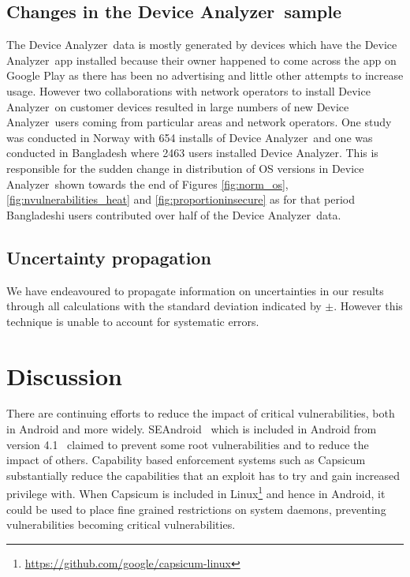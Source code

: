 \documentclass[conference,a4paper,twoside]{IEEEtran}
\newcommand{\da}{Device Analyzer}
\begin{document}
\subsection{Changes in the \da\ sample}
The \da\ data is mostly generated by devices which have the \da\ app installed because their owner happened to come across the app on Google Play as there has been no advertising and little other attempts to increase usage.
However two collaborations with network operators to install \da\ on customer devices resulted in large numbers of new \da\ users coming from particular areas and network operators.
One study was conducted in Norway with 654 installs of \da\ and one was conducted in Bangladesh where 2463 users installed \da.
This is responsible for the sudden change in distribution of OS versions in \da\ shown towards the end of Figures \ref{fig:norm_os}, \ref{fig:nvulnerabilities_heat} and \ref{fig:proportioninsecure} as for that period Bangladeshi users contributed over half of the \da\ data.


\subsection{Uncertainty propagation}
\label{sec:uncertainty}
We have endeavoured to propagate information on uncertainties in our results through all calculations with the standard deviation indicated by $\pm$.
However this technique is unable to account for systematic errors.

\section{Discussion}
There are continuing efforts to reduce the impact of critical vulnerabilities, both in Android and more widely.
SEAndroid~\cite{Smalley2013} which is included in Android from version 4.1~\cite{jelly-bean-release} claimed to prevent some root vulnerabilities and to reduce the impact of others.
Capability based enforcement systems such as Capsicum~\cite{Watson2010} substantially reduce the capabilities that an exploit has to try and gain increased privilege with.
When Capsicum is included in Linux\footnote{\url{https://github.com/google/capsicum-linux}} and hence in Android, it could be used to place fine grained restrictions on system daemons, preventing vulnerabilities becoming critical vulnerabilities.
\end{document}
